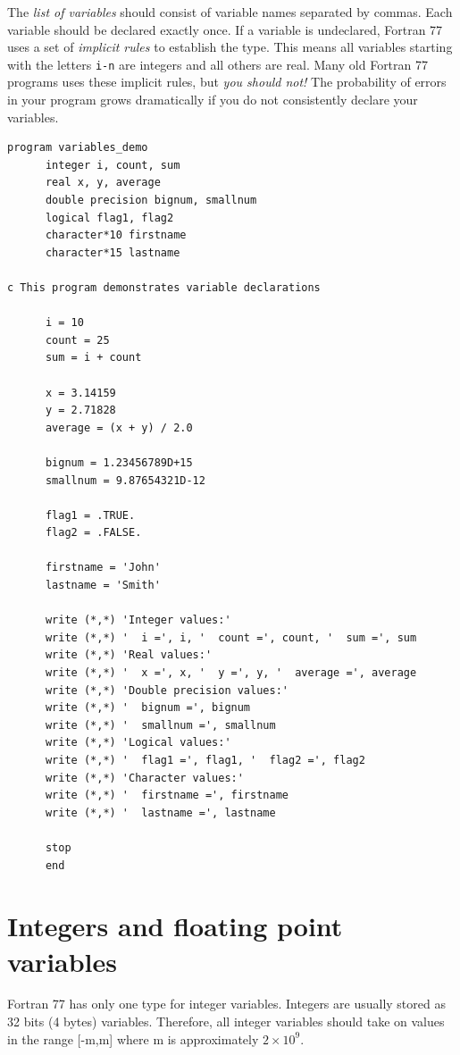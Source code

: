 The \emph{list of variables} should consist of variable names separated by commas. Each variable should be declared exactly once. If a variable is undeclared, Fortran 77 uses a set of \emph{implicit rules} to establish the type. This means all variables starting with the letters \texttt{i-n} are integers and all others are real. Many old Fortran 77 programs uses these implicit rules, but \emph{you should not!} The probability of errors in your program grows dramatically if you do not consistently declare your variables.

\begin{lstlisting}[style=fortran77]
      program variables_demo
      integer i, count, sum
      real x, y, average
      double precision bignum, smallnum
      logical flag1, flag2
      character*10 firstname
      character*15 lastname
      
c This program demonstrates variable declarations
      
      i = 10
      count = 25
      sum = i + count
      
      x = 3.14159
      y = 2.71828
      average = (x + y) / 2.0
      
      bignum = 1.23456789D+15
      smallnum = 9.87654321D-12
      
      flag1 = .TRUE.
      flag2 = .FALSE.
      
      firstname = 'John'
      lastname = 'Smith'
      
      write (*,*) 'Integer values:'
      write (*,*) '  i =', i, '  count =', count, '  sum =', sum
      write (*,*) 'Real values:'
      write (*,*) '  x =', x, '  y =', y, '  average =', average
      write (*,*) 'Double precision values:'
      write (*,*) '  bignum =', bignum
      write (*,*) '  smallnum =', smallnum
      write (*,*) 'Logical values:'
      write (*,*) '  flag1 =', flag1, '  flag2 =', flag2
      write (*,*) 'Character values:'
      write (*,*) '  firstname =', firstname
      write (*,*) '  lastname =', lastname
      
      stop
      end
\end{lstlisting}

\section{Integers and floating point variables}

Fortran 77 has only one type for integer variables. Integers are usually stored as 32 bits (4 bytes) variables. Therefore, all integer variables should take on values in the range [-m,m] where m is approximately $2 \times 10^9$.

